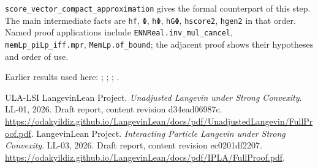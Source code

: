 \documentclass[11pt,a4paper]{article}
\begin{document}
\begin{leanbox}
\texttt{score\_\allowbreak{}vector\_\allowbreak{}compact\_\allowbreak{}approximation} gives the formal counterpart of this step. The main intermediate facts are \texttt{hf}, \texttt{Φ}, \texttt{h\allowbreak{}Φ}, \texttt{h\allowbreak{}GΦ}, \texttt{hscore2}, \texttt{hgen2} in that order. Named proof applications include \texttt{ENNReal.\allowbreak{}inv\_\allowbreak{}mul\_\allowbreak{}cancel}, \texttt{mem\allowbreak{}Lp\_\allowbreak{}pi\allowbreak{}Lp\_\allowbreak{}iff.\allowbreak{}mpr}, \texttt{Mem\allowbreak{}Lp.\allowbreak{}of\_\allowbreak{}bound}; the adjacent proof shows their hypotheses and order of use.
\end{leanbox}


Earlier results used here: \cite[Section~3.26.2]{LangevinLean2026ULASC}; \cite[Section~3.26.3]{LangevinLean2026ULASC}; \cite[Section~3.26.9]{LangevinLean2026ULASC}; \cite[Section~3.46.2]{LangevinLean2026ULASC}.

\begin{thebibliography}{ULA-LSI}
LangevinLean Project. \emph{Unadjusted Langevin under Strong Convexity}. LL-01, 2026. Draft report, content revision d34ead06987c. \url{https://odakyildiz.github.io/LangevinLean/docs/pdf/UnadjustedLangevin/FullProof.pdf}.
LangevinLean Project. \emph{Interacting Particle Langevin under Strong Convexity}. LL-03, 2026. Draft report, content revision ec0201df2207. \url{https://odakyildiz.github.io/LangevinLean/docs/pdf/IPLA/FullProof.pdf}.
\end{thebibliography}
\end{document}
